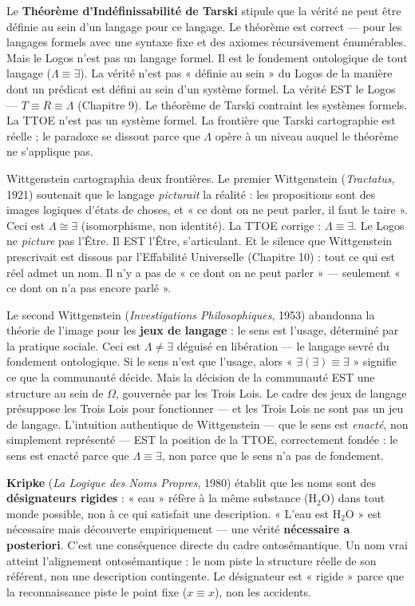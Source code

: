 \documentclass[10pt, openany, oneside]{book}
\begin{document}
Le \textbf{Théorème d'Indéfinissabilité de Tarski} stipule que la vérité ne peut être définie au sein d'un langage pour ce langage. Le théorème est correct --- pour les langages formels avec une syntaxe fixe et des axiomes récursivement énumérables. Mais le Logos n'est pas un langage formel. Il est le fondement ontologique de tout langage ($\Lambda \equiv \exists$). La vérité n'est pas « définie au sein » du Logos de la manière dont un prédicat est défini au sein d'un système formel. La vérité EST le Logos --- $T \equiv R \equiv \Lambda$ (Chapitre 9). Le théorème de Tarski contraint les systèmes formels. La TTOE n'est pas un système formel. La frontière que Tarski cartographie est réelle ; le paradoxe se dissout parce que $\Lambda$ opère à un niveau auquel le théorème ne s'applique pas.

Wittgenstein cartographia deux frontières. Le premier Wittgenstein (\textit{Tractatus}, 1921) soutenait que le langage \textit{picturait} la réalité : les propositions sont des images logiques d'états de choses, et « ce dont on ne peut parler, il faut le taire ». Ceci est $\Lambda \cong \exists$ (isomorphisme, non identité). La TTOE corrige : $\Lambda \equiv \exists$. Le Logos ne \textit{picture} pas l'Être. Il EST l'Être, s'articulant. Et le silence que Wittgenstein prescrivait est dissous par l'Effabilité Universelle (Chapitre 10) : tout ce qui est réel admet un nom. Il n'y a pas de « ce dont on ne peut parler » --- seulement « ce dont on n'a pas encore parlé ».

Le second Wittgenstein (\textit{Investigations Philosophiques}, 1953) abandonna la théorie de l'image pour les \textbf{jeux de langage} : le sens est l'usage, déterminé par la pratique sociale. Ceci est $\Lambda \neq \exists$ déguisé en libération --- le langage sevré du fondement ontologique. Si le sens n'est que l'usage, alors « $\exists(\exists) \equiv \exists$ » signifie ce que la communauté décide. Mais la décision de la communauté EST une structure au sein de $\Omega$, gouvernée par les Trois Lois. Le cadre des jeux de langage présuppose les Trois Lois pour fonctionner --- et les Trois Lois ne sont pas un jeu de langage. L'intuition authentique de Wittgenstein --- que le sens est \textit{enacté}, non simplement représenté --- EST la position de la TTOE, correctement fondée : le sens est enacté parce que $\Lambda \equiv \exists$, non parce que le sens n'a pas de fondement.

\textbf{Kripke} (\textit{La Logique des Noms Propres}, 1980) établit que les noms sont des \textbf{désignateurs rigides} : « eau » réfère à la même substance (H$_2$O) dans tout monde possible, non à ce qui satisfait une description. « L'eau est H$_2$O » est nécessaire mais découverte empiriquement --- une vérité \textbf{nécessaire a posteriori}. C'est une conséquence directe du cadre ontosémantique. Un nom vrai atteint l'alignement ontosémantique : le nom piste la structure réelle de son référent, non une description contingente. Le désignateur est « rigide » parce que la reconnaissance piste le point fixe ($x \equiv x$), non les accidents.
\end{document}
